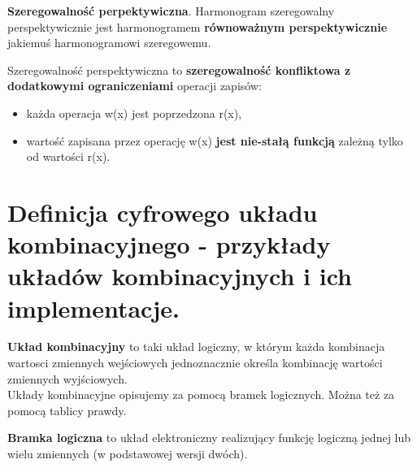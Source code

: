 \documentclass[12pt]{article}
\begin{document}
    \begin{definition}
        \textbf{Szeregowalność perpektywiczna}. Harmonogram szeregowalny perspektywicznie jest harmonogramem
        \textbf{równoważnym perspektywicznie} jakiemuś harmonogramowi szeregowemu.

        Szeregowalność perspektywiczna to \textbf{szeregowalność konfliktowa z dodatkowymi ograniczeniami} operacji zapisów:
        \begin{itemize}
            \item każda operacja w(x) jest poprzedzona r(x),
            \item wartość zapisana przez operację w(x) \textbf{jest nie-stałą funkcją} zależną tylko od wartości r(x).
        \end{itemize}
    \end{definition}

    \newpage

    \section{Definicja cyfrowego układu kombinacyjnego - przykłady układów kombinacyjnych i ich implementacje.}

    \begin{definition}
        \textbf{Układ kombinacyjny} to taki układ logiczny, w którym każda kombinacja wartosci zmiennych wejściowych
        jednoznacznie określa kombinację wartości zmiennych wyjściowych.\\

        Układy kombinacyjne opisujemy za pomocą bramek logicznych. Można też za pomocą tablicy prawdy.
    \end{definition}

    \begin{definition}
        \textbf{Bramka logiczna} to układ elektroniczny realizujący funkcję logiczną jednej lub wielu zmiennych
        (w podstawowej wersji dwóch).
    \end{definition}
\end{document}
